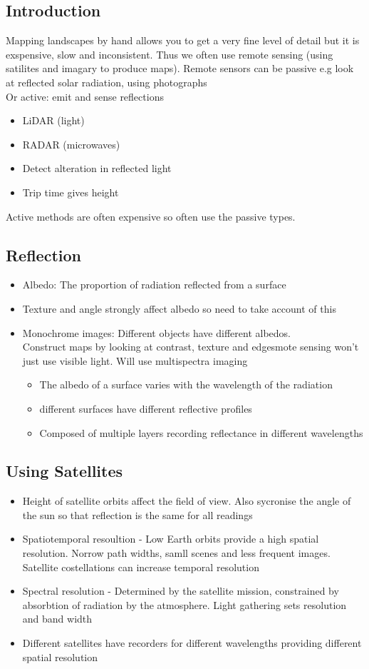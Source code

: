 \documentclass[11pt]{article}
\begin{document}
\subsection{Introduction} Mapping landscapes by hand allows you to get a very fine level of detail but it is exspensive, slow and inconsistent. Thus we often use remote sensing (using satilites and imagary to produce maps). Remote sensors can be passive e.g look at reflected solar radiation, using photographs \\ Or active: emit and sense reflections \begin{itemize}
\item LiDAR (light)
\item RADAR (microwaves)
\item Detect alteration in reflected light
\item Trip time gives height
\end{itemize}
Active methods are often expensive so often use the passive types.
\subsection{Reflection}
\begin{itemize}
\item Albedo: The proportion of radiation reflected from a surface
\item Texture and angle strongly affect albedo so need to take account of this
\item Monochrome images: Different objects have different albedos. \\ Construct maps by looking at contrast, texture and edgesmote sensing won't just use visible light. Will use multispectra imaging 
\begin{itemize}
\item The albedo of a surface varies with the wavelength of the radiation
\item different surfaces have different reflective profiles
\item Composed of multiple layers recording reflectance in different wavelengths
\end{itemize}
\end{itemize}
\subsection{Using Satellites}
\begin{itemize}
\item Height of satellite orbits affect the field of view. Also sycronise the angle of the sun so that reflection is the same for all readings
\item Spatiotemporal resoultion - Low Earth orbits provide a high spatial resolution. Norrow path widths, samll scenes and less frequent images. Satellite costellations can increase temporal resolution
\item Spectral resolution      - Determined by the satellite mission, constrained by absorbtion of radiation by the atmosphere. Light gathering sets resolution and band width
\item Different satellites have recorders for different wavelengths providing different spatial resolution 
\end{itemize}
\end{document}
